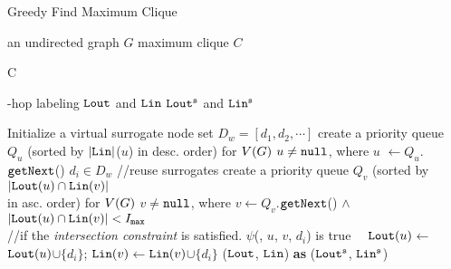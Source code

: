 \begin{algorithm}[t]
\caption{Greedy Find Maximum Clique}
\label{alg:greedy_clique}
\begin{algorithmic}[1]
\REQUIRE an undirected graph $G$
\ENSURE maximum clique $C$

\STATE C \GETS \varnothing

-hop labeling ${\tt Lout}$ and ${\tt Lin}$
\ENSURE ${\tt Lout^s}$ and ${\tt Lin^s}$

\STATE Initialize a virtual surrogate node set $D_w = [ d_1, d_2, \cdots ]$
\stab
\stab
\STATE create a priority queue $Q_u$ (sorted by $|{\tt Lin}|$($u$) in desc. order) for $V(G)$
 $u \not = {\tt null}$, where $u$ $\leftarrow Q_u$.${\tt getNext}$() 
\stab
\stab
\STATE {} $d_i \in D_w$  //reuse surrogates
\stab
\stab
\STATE \tab  \tab create a priority queue $Q_v$  (sorted by $| {\tt Lout}(u) \cap {\tt Lin}(v) |$ \\
\tab \tab in asc. order) for $V(G)$
\STATE \tab {} $v$$\not =$${\tt null}$, where $v \leftarrow Q_v$.${\tt getNext}$() $\wedge$ \\
\tab \tab \tab $|{\tt Lout}(u) \cap {\tt Lin}(v) | < I_{{\tt max}}$ \\
\stab 
\stab 
\tab \tab \tab  //{\small if the {\em intersection constraint} is satisfied.}
\STATE \tab \tab {} $\psi$(\hop, $u$, $v$, $d_i$) is true  
\STATE \tab \tab \tab \ \ ${\tt Lout}(u)$$\leftarrow$${\tt Lout}(u)$$\cup$$\{d_i\}$; ${\tt Lin}(v)$$\leftarrow$${\tt Lin}(v)$$\cup$$\{d_i\}$ 
\stab
{} (${\tt Lout}$, ${\tt Lin}$) {\bf as} (${\tt Lout^s}$, ${\tt Lin^s}$)

\end{algorithmic}
\end{algorithm}